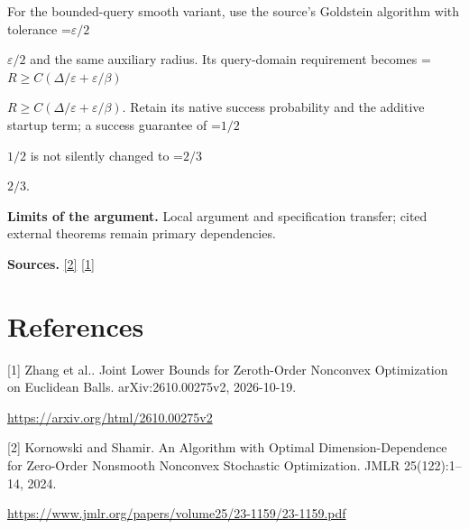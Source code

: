 \documentclass[10pt,a4paper]{article}
\newcommand{\AtlasMath}[1]{\par\begingroup\centering\setbox0=\hbox{$\displaystyle #1$}\ifdim\wd0>1.4\linewidth\typeout{ATLAS WIDE FORMULA: \the\wd0}\fi\ifdim\wd0>\linewidth\resizebox{\linewidth}{!}{\box0}\else\box0\fi\par\endgroup}
\newcommand{\AtlasInlineMath}[1]{\begingroup\setbox0=\hbox{$#1$}\ifdim\wd0>.4\linewidth\endgroup\AtlasMath{#1}\else\endgroup$#1$\fi}
\begin{document}
For the bounded-query smooth variant, use the source's Goldstein algorithm with tolerance \AtlasInlineMath{\varepsilon/2} and the same auxiliary radius. Its query-domain requirement becomes \AtlasInlineMath{R\ge C(\Delta/\varepsilon+\varepsilon/\beta)}. Retain its native success probability and the additive startup term; a success guarantee of \AtlasInlineMath{1/2} is not silently changed to \AtlasInlineMath{2/3}.

\textbf{Limits of the argument.} Local argument and specification transfer; cited external theorems remain primary dependencies.

\textbf{Sources.} \href{https://www.jmlr.org/papers/volume25/23-1159/23-1159.pdf}{[2]} \href{https://arxiv.org/html/2610.00275v2}{[1]}

\section{References}
[1] Zhang et al.. Joint Lower Bounds for Zeroth-Order Nonconvex Optimization on Euclidean Balls. arXiv:2610.00275v2, 2026-10-19.

\url{https://arxiv.org/html/2610.00275v2}

[2] Kornowski and Shamir. An Algorithm with Optimal Dimension-Dependence for Zero-Order Nonsmooth Nonconvex Stochastic Optimization. JMLR 25(122):1--14, 2024.

\url{https://www.jmlr.org/papers/volume25/23-1159/23-1159.pdf}
\end{document}
